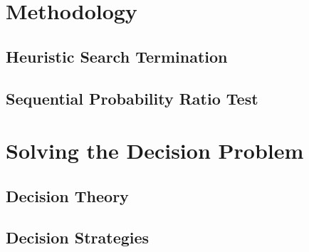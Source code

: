 \section{Methodology}


\subsection{Heuristic Search Termination}
\subsection{Sequential Probability Ratio Test}

\section{Solving the Decision Problem}
\subsection{Decision Theory}

\subsection{Decision Strategies}

